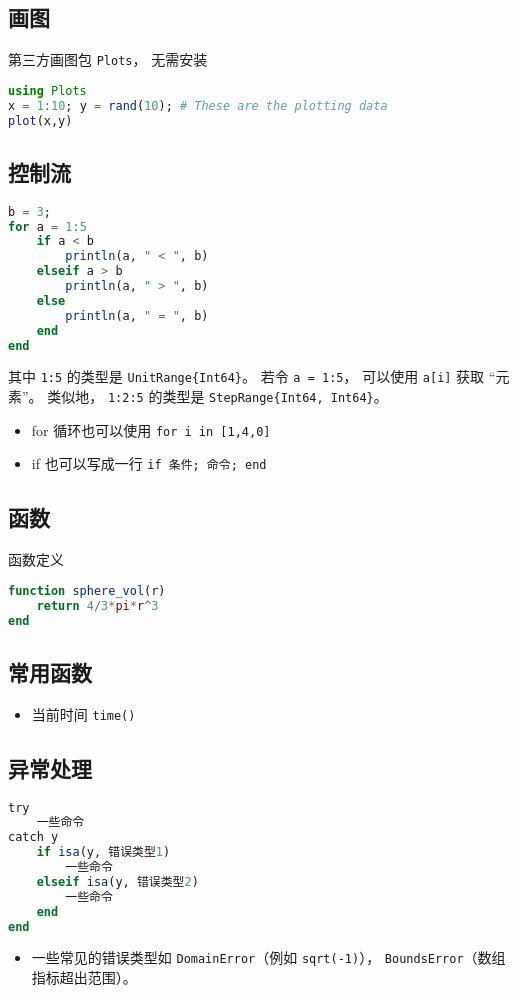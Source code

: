 \subsection{画图}
第三方画图包 \verb|Plots|， 无需安装
\begin{lstlisting}[language=Julia]
using Plots
x = 1:10; y = rand(10); # These are the plotting data
plot(x,y)
\end{lstlisting}

\subsection{控制流}
\begin{lstlisting}[language=Julia]
b = 3;
for a = 1:5
    if a < b
        println(a, " < ", b)
    elseif a > b
        println(a, " > ", b)
    else
        println(a, " = ", b)
    end
end
\end{lstlisting}
其中 \verb|1:5| 的类型是 \verb|UnitRange{Int64}|。 若令 \verb|a = 1:5|， 可以使用 \verb|a[i]| 获取 “元素”。 类似地， \verb|1:2:5| 的类型是 \verb|StepRange{Int64, Int64}|。

\begin{itemize}
\item for 循环也可以使用 \verb|for i in [1,4,0]|
\item if 也可以写成一行 \verb|if 条件; 命令; end|
\end{itemize}

\subsection{函数}
函数定义
\begin{lstlisting}[language=julia]
function sphere_vol(r)
    return 4/3*pi*r^3
end
\end{lstlisting}

\subsection{常用函数}
\begin{itemize}
\item 当前时间 \verb|time()|
\end{itemize}

\subsection{异常处理}
\begin{lstlisting}[language=julia]
try 
    一些命令
catch y
    if isa(y, 错误类型1)
        一些命令
    elseif isa(y, 错误类型2)
        一些命令
    end
end
\end{lstlisting}
\begin{itemize}
\item 一些常见的错误类型如 \verb|DomainError|（例如 \verb|sqrt(-1)|）， \verb|BoundsError|（数组指标超出范围）。
\end{itemize}


